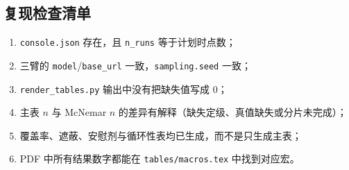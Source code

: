 \documentclass[UTF8,fontset=fandol,11pt,a4paper]{ctexart}
\begin{document}
\subsection{复现检查清单}

\begin{enumerate}
  \item \texttt{console.json} 存在，且 \texttt{n\_runs} 等于计划时点数；
  \item 三臂的 \texttt{model}/\texttt{base\_url} 一致，\texttt{sampling.seed} 一致；
  \item \texttt{render\_tables.py} 输出中没有把缺失值写成 0；
  \item 主表 $n$ 与 McNemar $n$ 的差异有解释（缺失定级、真值缺失或分片未完成）；
  \item 覆盖率、遮蔽、安慰剂与循环性表均已生成，而不是只生成主表；
  \item PDF 中所有结果数字都能在 \texttt{tables/macros.tex} 中找到对应宏。
\end{enumerate}

\clearpage


\end{document}
